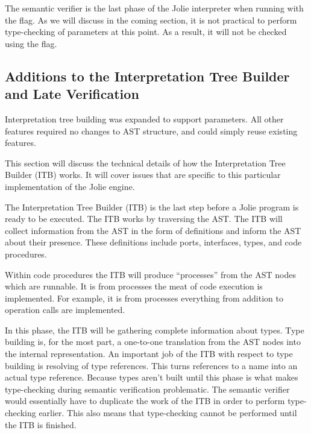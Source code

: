 The semantic verifier is the last phase of the Jolie interpreter when running
with the  flag. As we will discuss in the coming section, it is
not practical to perform type-checking of parameters at this point. As a
result, it will not be checked using the  flag.

\subsection{Additions to the Interpretation Tree Builder and Late Verification}


Interpretation tree building was expanded to support parameters. All other
features required no changes to AST structure, and could simply reuse existing
features.

This section will discuss the technical details of how the Interpretation Tree
Builder (ITB) works. It will cover issues that are specific to this particular
implementation of the Jolie engine.


The Interpretation Tree Builder (ITB) is the last step before a Jolie program
is ready to be executed. The ITB works by traversing the AST. The ITB will
collect information from the AST in the form of definitions and inform the AST
about their presence. These definitions include ports, interfaces, types, and
code procedures.


Within code procedures the ITB will produce ``processes'' from the AST nodes
which are runnable. It is from processes the meat of code execution is
implemented.  For example, it is from processes everything from addition to
operation calls are implemented.


In this phase, the ITB will be gathering complete information about types. Type
building is, for the most part, a one-to-one translation from the AST nodes
into the internal representation. An important job of the ITB with respect to
type building is resolving of type references.  This turns references to a name
into an actual type reference.  Because types aren't built until this phase is
what makes type-checking during semantic verification problematic. The semantic
verifier would essentially have to duplicate the work of the ITB in order to
perform type-checking earlier.  This also means that type-checking cannot be
performed until the ITB is finished.

